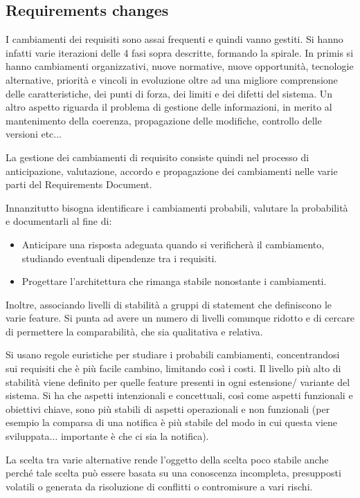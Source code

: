 \subsection{Requirements changes}
I cambiamenti dei requisiti sono assai frequenti e quindi vanno gestiti. Si hanno
infatti varie iterazioni delle 4 fasi sopra descritte, formando la spirale.
In primis si hanno cambiamenti organizzativi, nuove normative, nuove opportunità,
tecnologie alternative, priorità e vincoli in evoluzione oltre ad una migliore
comprensione delle caratteristiche, dei punti di forza, dei limiti e dei difetti
del sistema. Un altro aspetto riguarda il problema di gestione delle informazioni,
in merito al mantenimento della coerenza, propagazione delle modifiche, controllo
delle versioni etc$\dots$

La gestione dei cambiamenti di requisito consiste quindi nel processo di anticipazione,
valutazione, accordo e propagazione dei cambiamenti nelle varie parti del
Requirements Document.

Innanzitutto bisogna identificare i cambiamenti probabili, valutare la probabilità
e documentarli al fine di:
\begin{itemize}
      \item Anticipare una risposta adeguata quando si verificherà il cambiamento,
            studiando eventuali dipendenze tra i requisiti.
      \item Progettare l'architettura che rimanga stabile nonostante i cambiamenti.
\end{itemize}
Inoltre, associando livelli di stabilità a gruppi di statement che definiscono le
varie feature. Si punta ad avere un numero di livelli comunque ridotto e di cercare
di permettere la comparabilità, che sia qualitativa e relativa.

Si usano regole euristiche per studiare i probabili cambiamenti, concentrandosi
sui requisiti che è più facile cambino, limitando così i costi. Il livello più
alto di stabilità viene definito per quelle feature presenti in ogni estensione/
variante del sistema. Si ha che aspetti intenzionali e concettuali, così come aspetti
funzionali e obiettivi chiave, sono più stabili di aspetti operazionali e non
funzionali (per esempio la comparsa di una notifica è più stabile del modo in cui
questa viene sviluppata$\dots$ importante è che ci sia la notifica).

La scelta tra varie alternative rende l'oggetto della scelta poco stabile anche
perché tale scelta può essere basata su una conoscenza incompleta, presupposti
volatili o generata da risoluzione di conflitti o contromisure a vari rischi.

